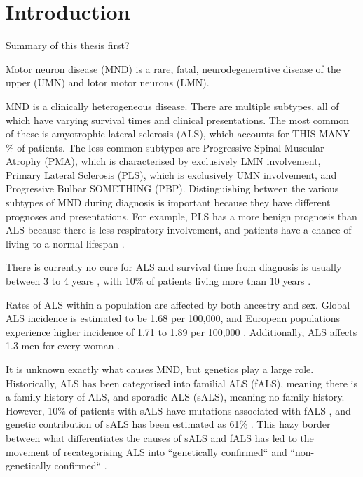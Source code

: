 \chapter{Introduction}
\label{introduction}

Summary of this thesis first?

Motor neuron disease (MND) is a rare, fatal, neurodegenerative disease of the upper (UMN) and lotor motor neurons (LMN).

MND is a clinically heterogeneous disease. There are multiple subtypes, all of which have varying survival times and clinical presentations. The most common of these is amyotrophic lateral sclerosis (ALS), which accounts for THIS MANY \% of patients. The less common subtypes are Progressive Spinal Muscular Atrophy (PMA), which is characterised by exclusively LMN involvement, Primary Lateral Sclerosis (PLS), which is exclusively UMN involvement, and Progressive Bulbar SOMETHING (PBP). Distinguishing between the various subtypes of MND during diagnosis is important because they have different prognoses and presentations. For example, PLS has a more benign prognosis than ALS because there is less respiratory involvement, and patients have a chance of living to a normal lifespan \cite{statlandPrimaryLateralSclerosis2015}.

There is currently no cure for ALS and survival time from diagnosis is usually between 3 to 4 years \cite{swinnenPhenotypicVariabilityAmyotrophic2014, goutmanRecentAdvancesDiagnosis2022a}, with 10\% of patients living more than 10 years \cite{pupilloLongtermSurvivalAmyotrophic2014}.

Rates of ALS within a population are affected by both ancestry and sex. Global ALS incidence is estimated to be 1.68 per 100,000, and European populations experience higher incidence of 1.71 to 1.89 per 100,000 \cite{marinVariationWorldwideIncidence2017}. Additionally, ALS affects 1.3 men for every woman \cite{fontanaTimetrendEvolutionDeterminants2021}.

It is unknown exactly what causes MND, but genetics play a large role. Historically, ALS has been categorised into familial ALS (fALS), meaning there is a family history of ALS, and sporadic ALS (sALS), meaning no family history. However, 10\% of patients with sALS have mutations associated with fALS \cite{hanbyRiskRelativesPatients2011}, and genetic contribution of sALS has been estimated as 61\% \cite{al-chalabiEstimateAmyotrophicLateral2010}. This hazy border between what differentiates the causes of sALS and fALS has led to the movement of recategorising ALS into ``genetically confirmed`` and ``non-genetically confirmed`` \cite{feldmanAmyotrophicLateralSclerosis2022}.

